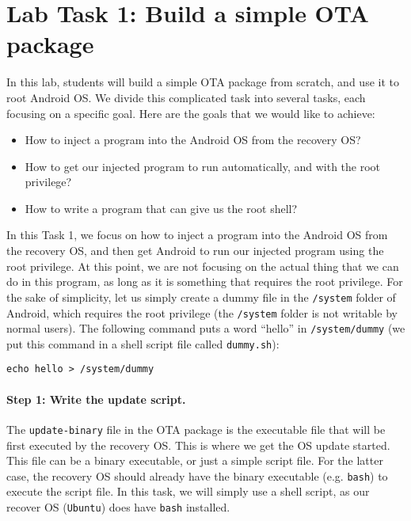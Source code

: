 \section{Lab Task 1: Build a simple OTA package}

In this lab, students will build a simple OTA package from scratch, and 
use it to root Android OS. We divide this complicated task into several
tasks, each focusing on a specific goal. Here are the goals that we would
like to achieve:

\begin{itemize} 
\item How to inject a program into the Android OS from the recovery OS?
\item How to get our injected program to run automatically, and with the root privilege?
\item How to write a program that can give us the root shell?
\end{itemize} 
  

In this Task 1, we focus on how to inject a program into the Android OS
from the recovery OS, and then get Android to run our injected program
using the root privilege. At this point, we are not focusing on the
actual thing that we can do in this program, as long as it is something that
requires the root privilege. For the sake of simplicity, let us simply
create a dummy file in the \texttt{/system} folder of Android, which
requires the root privilege (the \texttt{/system} folder is not 
writable by normal users). The following command puts a word
``hello'' in \texttt{/system/dummy} (we put this command in a shell script 
file called \texttt{dummy.sh}):  

\begin{lstlisting}
echo hello > /system/dummy
\end{lstlisting}



\paragraph{Step 1: Write the update script.}
The \texttt{update-binary} file in the OTA package is the executable file 
that will be first executed by the recovery OS. This is where we get the OS update started.
This file can be a binary executable, or just a simple script file. For the
latter case, the recovery OS should already have the binary executable
(e.g. \texttt{bash}) to execute the script file. In this task, we will
simply use a shell script, as our recover OS (\texttt{Ubuntu}) does have 
\texttt{bash} installed. 


